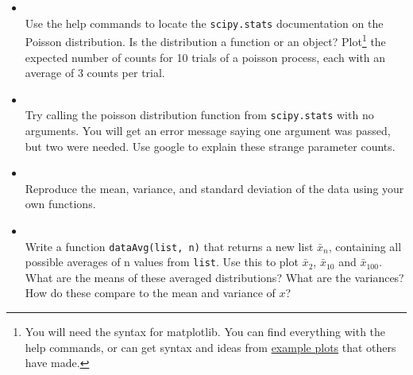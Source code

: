 \documentclass[justified]{tufte-handout}
\newcommand{\matplotlibGalleryLink}{http://matplotlib.org/gallery.html}
\newcommand{\matplotlibGalleryNote}{\footnote{You will need the syntax for
      matplotlib. You can find everything with the help commands, or can get
      syntax and ideas from \href{\matplotlibGalleryLink}{example plots} that
      others have made.}}
\begin{document}
\begin{itemize}
\item[]  \\
  Use the help commands to locate the \texttt{scipy.stats} documentation on the
  Poisson distribution. Is the distribution a function or an object?
  Plot\matplotlibGalleryNote{} \;the expected number of counts for 10 trials of a
  poisson process, each with an average of 3 counts per trial.

\item[]  \\
  Try calling the poisson distribution function from \texttt{scipy.stats} with
  no arguments. You will get an error message saying one argument was passed,
  but two were needed. Use google to explain these strange parameter counts.

\item[]  \\
  Reproduce the mean, variance, and standard deviation of the data using your
  own functions.




\item[]
 \\
  Write a function \texttt{dataAvg(list, n)} that returns a new list
  $\bar{x}_n$, containing all possible averages of n values from
  \texttt{list}. Use this to plot $\bar{x}_2$, $\bar{x}_{10}$ and
  $\bar{x}_{100}$. What are the means of these averaged distributions? What are
  the variances? How do these compare to the mean and variance of $x$?
\end{itemize}
\end{document}
